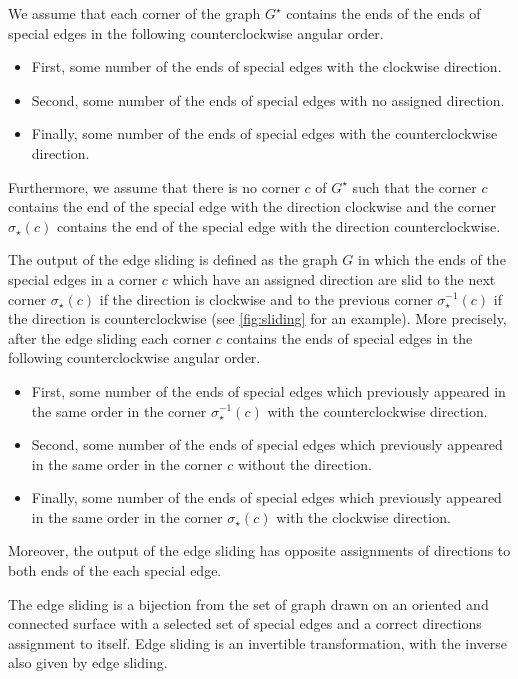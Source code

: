 \documentclass[submission]{FPSAC2021}
\DeclareMathOperator{\res}{\star}
\begin{document}
We assume that each corner of the 
graph $G^{\res}$ contains the ends 
of the ends of special edges in the 
following  counterclockwise angular 
order.  
\begin{itemize}

\item First, some number of the 
		ends of special edges 
		with the clockwise 
		direction.

\item Second, some number of the 
		ends of special edges with 
		no assigned direction. 
\item Finally, some number of the
		ends of special edges with 
		the counterclockwise 
		direction. 
\end{itemize}  
Furthermore, we assume that there is no 
corner $c$ of $G^{\res}$ such that the corner 
$c$ contains the end of the special 
edge with the direction clockwise and 
the corner $\sigma_{\res}(c)$ contains the end 
of the  special edge with the direction 
counterclockwise.

The output of the edge sliding is defined 
as the graph $G$ in which the ends of the 
special edges in a corner $c$ which have 
an assigned direction are slid to the 
next corner $\sigma_{\res}(c)$ if the direction 
is clockwise and to the previous corner 
$\sigma_{\res}^{-1}(c)$ if the direction is 
counterclockwise (see \cref{fig:sliding} 
for an example). More precisely, after 
the edge sliding each corner $c$ contains 
the ends of special edges in the following 
counterclockwise angular order.  
\begin{itemize}

\item First, some number of the ends 
		of special edges which 
		previously appeared in the 
		same order in the corner 
		$\sigma_{\res}^{-1}(c)$
		with the counterclockwise 
		direction.
\item Second, some number of the ends 
		of special edges which 
		previously appeared in the 
		same order in the corner $c$
		without the direction. 
\item Finally, some number of the ends 
		of special edges which previously 
		appeared in the same order 
		in the corner $\sigma_{\res}(c)$
		with the clockwise direction.
\end{itemize}  
Moreover, the output of the edge sliding
has opposite assignments of directions to
both ends of the each special edge.

The edge sliding is a bijection from the 
set of graph drawn on an oriented and 
connected surface with a selected set of 
special edges and a correct directions 
assignment to itself. Edge sliding is an 
invertible transformation, with the inverse 
also given by edge sliding. 
\end{document}
